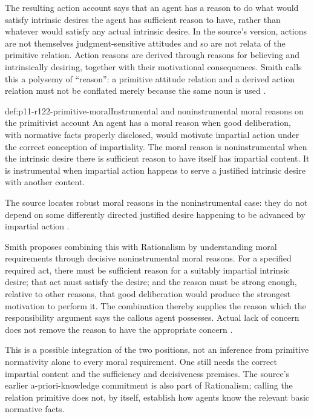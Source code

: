 The resulting action account says that an agent has a reason to do what
would satisfy intrinsic desires the agent has sufficient reason to have,
rather than whatever would satisfy any actual intrinsic desire. In the
source's version, actions are not themselves judgment-sensitive attitudes
and so are not relata of the primitive relation. Action reasons are
derived through reasons for believing and intrinsically desiring, together
with their motivational consequences. Smith calls this a polysemy of
``reason'': a primitive attitude relation and a derived action relation
must not be conflated merely because the same noun is used
\parencite[p.~698]{Smith2021MoralReasons}.

\begin{hbdefinition}{def:p11-r122-primitive-moral}{Instrumental and noninstrumental moral reasons on the primitivist account}
An agent has a moral reason when good deliberation, with normative facts
properly disclosed, would motivate impartial action under the correct
conception of impartiality. The moral reason is noninstrumental when
the intrinsic desire there is sufficient reason to have itself has
impartial content. It is instrumental when impartial action happens to
serve a justified intrinsic desire with another content.

The source locates robust moral reasons in the noninstrumental case:
they do not depend on some differently directed justified desire
happening to be advanced by impartial action
\parencite[p.~698]{Smith2021MoralReasons}.
\end{hbdefinition}

Smith proposes combining this with Rationalism by understanding moral
requirements through decisive noninstrumental moral reasons. For a
specified required act, there must be sufficient reason for a suitably
impartial intrinsic desire; that act must satisfy the desire; and the
reason must be strong enough, relative to other reasons, that good
deliberation would produce the strongest motivation to perform it.
The combination thereby supplies the reason which the responsibility
argument says the callous agent possesses. Actual lack of concern does
not remove the reason to have the appropriate concern
\parencite[pp.~698--699]{Smith2021MoralReasons}.

This is a possible integration of the two positions, not an inference
from primitive normativity alone to every moral requirement. One still
needs the correct impartial content and the sufficiency and decisiveness
premises. The source's earlier a-priori-knowledge commitment is also part
of Rationalism; calling the relation primitive does not, by itself,
establish how agents know the relevant basic normative facts.

